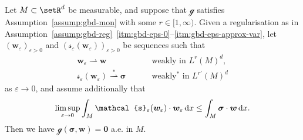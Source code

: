 \documentclass[reqno,a4paper]{amsart}
\def\vec#1{\boldsymbol{#1}}
\def\d{{\rm d}}
\def\dx{\,\d x}
\def\wconv{\rightharpoonup}
\def\wsconv{\overset{*}{\rightharpoonup}}
\def\b0{\vec{0}}
\def\bw{\vec{w}}
\def\bsigma{\vec{\sigma}}
\def\gbd{\vec{\mathcal{g}}}
\def\Srel{\vec{\mathcal{s}}}
\def\Seps{\Srel_{\varepsilon}}
\begin{document}
	\begin{lemma}\label{lem:minty}
		
		Let $M \subset \setR^d$ {be measurable}, and suppose that $\gbd$ satisfies Assumption~\ref{assump:gbd-mon} with some $r \in [1,\infty)$. 
		Given a regularisation as in Assumption~\ref{assump:gbd-reg}~\ref{itm:gbd-eps-0}--\ref{itm:gbd-eps-approx-var}, let  $(\bw_{\varepsilon})_{\varepsilon >0}$ and $(\Seps(\bw_{\varepsilon}))_{\varepsilon >0}$ be sequences such that 
		\begin{align}\label{conv:minty-1}
			\bw_{\varepsilon} \wconv  \bw \qquad & \text{ weakly in } L^{r}(M)^d,\\
			\label{conv:minty-2}
			\Seps(\bw_{\varepsilon}) \wsconv  \bsigma \qquad & \text{ weakly$^*$ in } L^{r'}(M)^d
		\end{align}
		as $\varepsilon \to 0$, 
		and assume additionally that 
		\begin{align}\label{est:minty-lsc}
			\limsup_{\varepsilon \to 0}	\int_{M}  \Seps(\bw_{\varepsilon}) \cdot \bw_{\varepsilon}  \dx \leq\int_{M} \bsigma \cdot \bw  \dx. 
		\end{align}
		Then we have $\gbd(\bsigma,\bw) = \b0$ a.e. in $M$. 
		
	\end{lemma}
\end{document}
